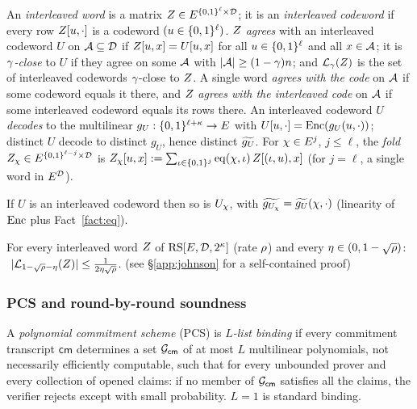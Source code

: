 \begin{definition}\label{def:interleaved}
An \emph{interleaved word} is a matrix $Z \in E^{\{0,1\}^{\ell} \times \mathcal{D}}$; it is an \emph{interleaved codeword} if every row $Z[u, \cdot]$ is a codeword $(u \in \{0,1\}^{\ell})$. $Z$ \emph{agrees} with an interleaved codeword $U$ on $\mathcal{A} \subseteq \mathcal{D}$ if $Z[u,x] = U[u,x]$ for all $u \in \{0,1\}^{\ell}$ and all $x \in \mathcal{A}$; it is \emph{$\gamma$-close} to $U$ if they agree on some $\mathcal{A}$ with $|\mathcal{A}| \ge (1-\gamma)n$; and $\mathcal{L}_\gamma(Z)$ is the set of interleaved codewords $\gamma$-close to $Z$. A single word \emph{agrees with the code} on $\mathcal{A}$ if some codeword equals it there, and $Z$ \emph{agrees with the interleaved code} on $\mathcal{A}$ if some interleaved codeword equals its rows there. An interleaved codeword $U$ \emph{decodes} to the multilinear $g_U : \{0,1\}^{\ell + \kappa} \to E$ with $U[u, \cdot] = \mathrm{Enc}(g_U(u, \cdot))$; distinct $U$ decode to distinct $g_U$, hence distinct $\widetilde{g_U}$. For $\chi \in E^{j}$, $j \le \ell$, the \emph{fold} $Z_\chi \in E^{\{0,1\}^{\ell - j} \times \mathcal{D}}$ is $Z_\chi[u, x] := \sum_{\iota \in \{0,1\}^{j}} \operatorname{eq}(\chi, \iota)\, Z[(\iota, u), x]$ (for $j = \ell$, a single word in $E^{\mathcal{D}}$).
\end{definition}

\begin{fact}\label{fact:fold-decode}
If $U$ is an interleaved codeword then so is $U_\chi$, with $\widetilde{g_{U_\chi}} = \widetilde{g_U}(\chi, \cdot)$ (linearity of $\mathrm{Enc}$ plus Fact~\ref{fact:eq}).
\end{fact}

\begin{theorem}\label{thm:johnson-interleaved}
For every interleaved word $Z$ of $\mathrm{RS}[E,\mathcal{D},2^\kappa]$ (rate $\rho$) and every $\eta \in (0, 1-\sqrt{\rho})$: $\ |\mathcal{L}_{1-\sqrt{\rho}-\eta}(Z)| \le \frac{1}{2\eta\sqrt{\rho}}$. (see \S\ref{app:johnson} for a self-contained proof)
\end{theorem}

\subsubsection{PCS and round-by-round soundness}\label{sec:iopcs}

\begin{definition}\label{def:listbinding}
A \emph{polynomial commitment scheme} (PCS) is \emph{$L$-list binding} if every commitment transcript $\mathsf{cm}$ determines a set $\mathcal{G}_{\mathsf{cm}}$ of at most $L$ multilinear polynomials, not necessarily efficiently computable, such that for every unbounded prover and every collection of opened claims: if no member of $\mathcal{G}_{\mathsf{cm}}$ satisfies all the claims, the verifier rejects except with small probability. $L = 1$ is standard binding.
\end{definition}

